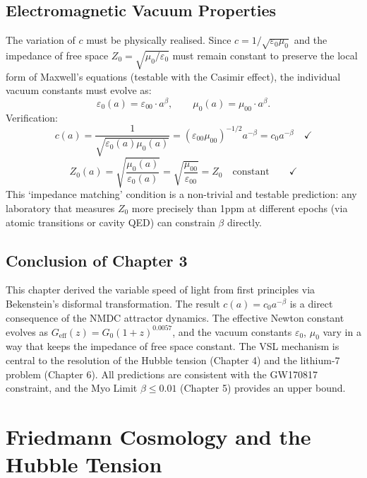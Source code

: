 \documentclass[12pt,a4paper]{book}
\theoremstyle{definition}
\theoremstyle{remark}
\begin{document}
\section{Electromagnetic Vacuum Properties}

The variation of $c$ must be physically realised. Since $c = 1/\sqrt{\varepsilon_0\mu_0}$ and the impedance of free space $Z_0 = \sqrt{\mu_0/\varepsilon_0}$ must remain constant to preserve the local form of Maxwell's equations (testable with the Casimir effect), the individual vacuum constants must evolve as:
\begin{equation}
    \varepsilon_0(a) = \varepsilon_{00} \cdot a^{\beta}, \qquad \mu_0(a) = \mu_{00} \cdot a^{\beta}.
\end{equation}
Verification:
\begin{equation}
    c(a) = \frac{1}{\sqrt{\varepsilon_0(a)\mu_0(a)}} = (\varepsilon_{00}\mu_{00})^{-1/2}a^{-\beta} = c_0 a^{-\beta} \quad \checkmark
\end{equation}
\begin{equation}
    Z_0(a) = \sqrt{\frac{\mu_0(a)}{\varepsilon_0(a)}} = \sqrt{\frac{\mu_{00}}{\varepsilon_{00}}} = Z_0 \quad \text{constant} \qquad \checkmark
\end{equation}
This `impedance matching' condition is a non-trivial and testable prediction: any laboratory that measures $Z_0$ more precisely than 1ppm at different epochs (via atomic transitions or cavity QED) can constrain $\beta$ directly.

\section{Conclusion of Chapter 3}

This chapter derived the variable speed of light from first principles via Bekenstein's disformal transformation. The result $c(a) = c_0 a^{-\beta}$ is a direct consequence of the NMDC attractor dynamics. The effective Newton constant evolves as $G_{\mathrm{eff}}(z) = G_0(1+z)^{0.0057}$, and the vacuum constants $\varepsilon_0$, $\mu_0$ vary in a way that keeps the impedance of free space constant. The VSL mechanism is central to the resolution of the Hubble tension (Chapter 4) and the lithium-7 problem (Chapter 6). All predictions are consistent with the GW170817 constraint, and the Myo Limit $\beta \leq 0.01$ (Chapter 5) provides an upper bound.

\chapter{Friedmann Cosmology and the Hubble Tension}
\label{ch:friedmann}
\end{document}
